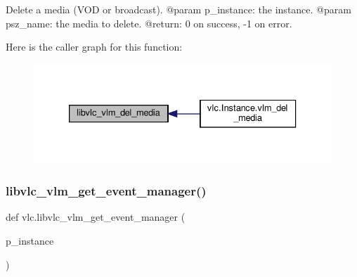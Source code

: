 \begin{DoxyVerb}Delete a media (VOD or broadcast).
@param p_instance: the instance.
@param psz_name: the media to delete.
@return: 0 on success, -1 on error.
\end{DoxyVerb}
 Here is the caller graph for this function\+:
\nopagebreak
\begin{figure}[H]
\begin{center}
\leavevmode
\includegraphics[width=333pt]{namespacevlc_a7142455eda42a304940d0c22450ede79_icgraph}
\end{center}
\end{figure}
\mbox{\label{namespacevlc_aeeafd7297de31ccc1034c0e37175715f}} 
\subsubsection{\texorpdfstring{libvlc\+\_\+vlm\+\_\+get\+\_\+event\+\_\+manager()}{libvlc\_vlm\_get\_event\_manager()}}
{\footnotesize\ttfamily def vlc.\+libvlc\+\_\+vlm\+\_\+get\+\_\+event\+\_\+manager (\begin{DoxyParamCaption}\item[{}]{p\+\_\+instance }\end{DoxyParamCaption})}

